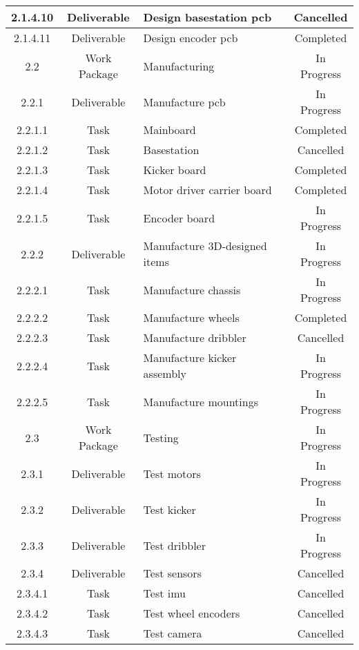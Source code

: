 \begin{longtable}{|c|c|m{}|c|}
    \rowcolor{c} 2.1.4.10 & Deliverable & Design basestation \acs{pcb} & Cancelled \\ \hline
    \rowcolor{d} 2.1.4.11 & Deliverable & Design encoder \acs{pcb} & Completed \\ \hline
    \rowcolor{p} 2.2 & Work Package & Manufacturing & In Progress \\ \hline
    \rowcolor{p} 2.2.1 & Deliverable & Manufacture \acs{pcb} & In Progress \\ \hline
    \rowcolor{d} 2.2.1.1 & Task & Mainboard & Completed \\ \hline
    \rowcolor{c} 2.2.1.2 & Task & Basestation & Cancelled \\ \hline
    \rowcolor{d} 2.2.1.3 & Task & Kicker board & Completed \\ \hline
    \rowcolor{d} 2.2.1.4 & Task & Motor driver carrier board & Completed\\ \hline
    \rowcolor{p} 2.2.1.5 & Task & Encoder board & In Progress \\ \hline
    \rowcolor{p} 2.2.2 & Deliverable & Manufacture 3D-designed items & In Progress \\ \hline
    \rowcolor{p} 2.2.2.1 & Task & Manufacture chassis & In Progress \\ \hline
    \rowcolor{d} 2.2.2.2 & Task & Manufacture wheels & Completed \\ \hline
    \rowcolor{c} 2.2.2.3 & Task & Manufacture dribbler & Cancelled \\ \hline
    \rowcolor{p} 2.2.2.4 & Task & Manufacture kicker assembly & In Progress \\ \hline
    \rowcolor{p} 2.2.2.5 & Task & Manufacture mountings & In Progress \\ \hline
    \rowcolor{p} 2.3 & Work Package & Testing & In Progress \\ \hline
    \rowcolor{p} 2.3.1 & Deliverable & Test motors & In Progress \\ \hline
    \rowcolor{p} 2.3.2 & Deliverable & Test kicker & In Progress \\ \hline
    \rowcolor{p} 2.3.3 & Deliverable & Test dribbler & In Progress \\ \hline
    \rowcolor{c} 2.3.4 & Deliverable & Test sensors & Cancelled \\ \hline
    \rowcolor{c} 2.3.4.1 & Task & Test \acs{imu} & Cancelled \\ \hline
    \rowcolor{c} 2.3.4.2 & Task & Test wheel encoders & Cancelled \\ \hline
    \rowcolor{c} 2.3.4.3 & Task & Test camera & Cancelled \\ \hline

\end{longtable}
